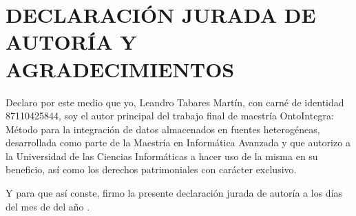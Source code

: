\chapter*{\large DECLARACIÓN JURADA DE AUTORÍA Y AGRADECIMIENTOS}

\lhead{}
\chead{}
\lfoot{}
\cfoot{}
\rfoot{\thepage}
\renewcommand{\headrulewidth}{0.4pt}

Declaro por este medio que yo, Leandro Tabares Martín, con carné de identidad 87110425844, soy el autor principal del trabajo final de maestría OntoIntegra: Método para la integración de datos almacenados en fuentes heterogéneas, desarrollada como parte de la Maestría en Informática Avanzada y que autorizo a la Universidad de las Ciencias Informáticas a hacer uso de la misma en su beneficio, así como los derechos patrimoniales con carácter exclusivo.

\espacios

Y para que así conste, firmo la presente declaración jurada de autoría a los \fillDia días del mes de \fillMes del año \fillAnno.

\espacios
\espacios

\firmaTesis
